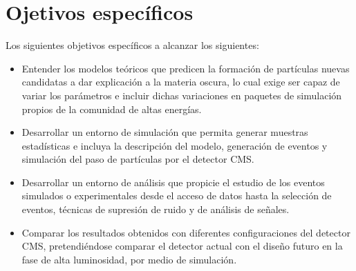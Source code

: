 \chapter{Ojetivos específicos}

Los siguientes objetivos específicos a alcanzar los siguientes:
\begin{itemize}
    \item Entender los modelos teóricos que predicen la formación de partículas nuevas candidatas a dar explicación a la materia oscura, lo cual exige ser capaz de variar los parámetros e incluir dichas variaciones en paquetes de simulación propios de la comunidad de altas energías.
    \item Desarrollar un entorno de simulación que permita generar muestras estadísticas e incluya la descripción del modelo, generación de eventos y simulación del paso de partículas por el detector CMS.
    \item Desarrollar un entorno de análisis que propicie el estudio de los eventos simulados o experimentales desde el acceso de datos hasta la selección de eventos, técnicas de supresión de ruido y de análisis de señales.
    \item Comparar los resultados obtenidos con diferentes configuraciones del detector CMS, pretendiéndose comparar el detector actual con el diseño futuro en la fase de alta luminosidad, por medio de simulación.
\end{itemize}
